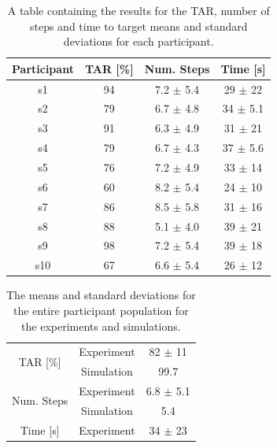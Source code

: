 \documentclass[a4paper, twoside]{article}
\begin{document}
\begin{table}
  \centering
  \caption{A table containing the results for the TAR, number of steps and time to target means and standard deviations for each participant. }\label{tab:results-full}
  \begin{tabular}{cccc}
    \toprule
    Participant & TAR [\%] & Num. Steps & Time [s] \\ \midrule
    s1 & 94 & 7.2 $\pm$ 5.4 & 29 $\pm$ 22 \\ \midrule
    s2 & 79 & 6.7 $\pm$ 4.8 & 34 $\pm$ 5.1 \\ \midrule
    s3 & 91 & 6.3 $\pm$ 4.9 & 31 $\pm$ 21 \\ \midrule
    s4 & 79 & 6.7 $\pm$ 4.3 & 37 $\pm$ 5.6 \\ \midrule
    s5 & 76 & 7.2 $\pm$ 4.9 & 33 $\pm$ 14 \\ \midrule
    s6 & 60 & 8.2 $\pm$ 5.4 & 24 $\pm$ 10 \\ \midrule
    s7 & 86 & 8.5 $\pm$ 5.8 & 31 $\pm$ 16 \\ \midrule
    s8 & 88 & 5.1 $\pm$ 4.0 & 39 $\pm$ 21 \\ \midrule
    s9 & 98 & 7.2 $\pm$ 5.4 & 39 $\pm$ 18 \\ \midrule
    s10 & 67 & 6.6 $\pm$ 5.4 & 26 $\pm$ 12 \\ \midrule
    \bottomrule                    
  \end{tabular}                    
\end{table}                        
                                   
\begin{table}                      
  \centering                       
  \caption{The means and standard deviations for the entire participant population for the experiments and simulations.}\label{tab:results-summary}
  \begin{tabular}{ccc}
    \toprule
    \multirow{2}{*}{TAR [\%]} & Experiment & 82 $\pm$ 11  \\ 
			      & Simulation & 99.7 \\ \midrule
    \multirow{2}{*}{Num. Steps} & Experiment & 6.8 $\pm$ 5.1 \\ 
			        & Simulation & 5.4 \\ \midrule
    Time [s] & Experiment & 34 $\pm$ 23  \\ \midrule
    \bottomrule
  \end{tabular}
\end{table}
\end{document}
